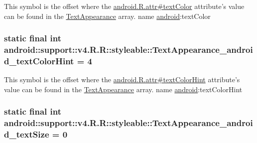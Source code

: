 This symbol is the offset where the \hyperlink{}{android.R.attr\#textColor} attribute's value can be found in the \hyperlink{classandroid_1_1support_1_1v4_1_1_r_1_1styleable_958f0ff7225bca693e30641e14dd4569}{TextAppearance} array.  name \hyperlink{namespaceandroid}{android}:textColor \hypertarget{classandroid_1_1support_1_1v4_1_1_r_1_1styleable_13b2c5daf5c13f138a2f6590d38a3f8c}{
\subsubsection[{TextAppearance\_\-android\_\-textColorHint}]{\setlength{\rightskip}{0pt plus 5cm}static final int android::support::v4.R.R::styleable::TextAppearance\_\-android\_\-textColorHint = 4}}
\label{classandroid_1_1support_1_1v4_1_1_r_1_1styleable_13b2c5daf5c13f138a2f6590d38a3f8c}


This symbol is the offset where the \hyperlink{}{android.R.attr\#textColorHint} attribute's value can be found in the \hyperlink{classandroid_1_1support_1_1v4_1_1_r_1_1styleable_958f0ff7225bca693e30641e14dd4569}{TextAppearance} array.  name \hyperlink{namespaceandroid}{android}:textColorHint \hypertarget{classandroid_1_1support_1_1v4_1_1_r_1_1styleable_0ef17f89c7c229543a6ba3224cc45bde}{
\subsubsection[{TextAppearance\_\-android\_\-textSize}]{\setlength{\rightskip}{0pt plus 5cm}static final int android::support::v4.R.R::styleable::TextAppearance\_\-android\_\-textSize = 0}}
\label{classandroid_1_1support_1_1v4_1_1_r_1_1styleable_0ef17f89c7c229543a6ba3224cc45bde}


